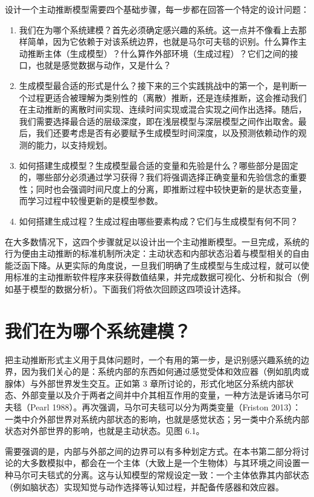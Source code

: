 设计一个主动推断模型需要四个基础步骤，每一步都在回答一个特定的设计问题：

\begin{enumerate}
\item 我们在为哪个系统建模？首先必须确定感兴趣的系统。这一点并不像看上去那样简单，因为它依赖于对该系统边界，也就是马尔可夫毯的识别。什么算作主动推断主体（生成模型）？什么算作外部环境（生成过程）？它们之间的接口，也就是感觉数据与动作，又是什么？
\item 生成模型最合适的形式是什么？接下来的三个实践挑战中的第一个，是判断一个过程更适合被理解为类别性的（离散）推断，还是连续推断，这会推动我们在主动推断的离散时间实现、连续时间实现或混合实现之间作出选择。随后，我们需要选择最合适的层级深度，即在浅层模型与深层模型之间作出取舍。最后，我们还要考虑是否有必要赋予生成模型时间深度，以及预测依赖动作的观测的能力，以支持规划。
\item 如何搭建生成模型？生成模型最合适的变量和先验是什么？哪些部分是固定的，哪些部分必须通过学习获得？我们将强调选择正确变量和先验信念的重要性；同时也会强调时间尺度上的分离，即推断过程中较快更新的是状态变量，而学习过程中较慢更新的是模型参数。
\item 如何搭建生成过程？生成过程由哪些要素构成？它们与生成模型有何不同？
\end{enumerate}

在大多数情况下，这四个步骤就足以设计出一个主动推断模型。一旦完成，系统的行为便由主动推断的标准机制所决定：主动状态和内部状态沿着与模型相关的自由能泛函下降。从更实际的角度说，一旦我们明确了生成模型与生成过程，就可以使用标准的主动推断软件程序来获得数值结果，并完成数据可视化、分析和拟合（例如基于模型的数据分析）。下面我们将依次回顾这四项设计选择。

\section{我们在为哪个系统建模？}

把主动推断形式主义用于具体问题时，一个有用的第一步，是识别感兴趣系统的边界，因为我们关心的是：系统内部的东西如何通过感觉受体和效应器（例如肌肉或腺体）与外部世界发生交互。正如第 3 章所讨论的，形式化地区分系统内部状态、外部变量以及介于两者之间并中介其相互作用的变量，一种方法是诉诸马尔可夫毯（Pearl 1988）。再次强调，马尔可夫毯可以分为两类变量（Friston 2013）：一类中介外部世界对系统内部状态的影响，也就是感觉状态；另一类中介系统内部状态对外部世界的影响，也就是主动状态。见图 6.1。

需要强调的是，内部与外部之间的边界可以有多种划定方式。在本书第二部分将讨论的大多数模拟中，都会在一个主体（大致上是一个生物体）与其环境之间设置一种马尔可夫毯式的分离。这与认知模型的常规设定一致：一个主体依靠其内部状态（例如脑状态）实现知觉与动作选择等认知过程，并配备传感器和效应器。

